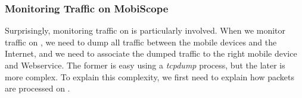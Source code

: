 


\subsubsection{Monitoring Traffic on MobiScope}
\label{sec:monit-traff-mobiscope}

Surprisingly, monitoring traffic on \platname{} is particularly
involved. When we monitor traffic on \platname, we need to dump
all traffic between the mobile devices and the Internet, and we need to
associate the dumped traffic to the right mobile device and Webservice. The
former is easy using a \textit{tcpdump} process, but the later is more
complex. To explain this complexity, we first need to explain how
packets are processed on \platname. 


